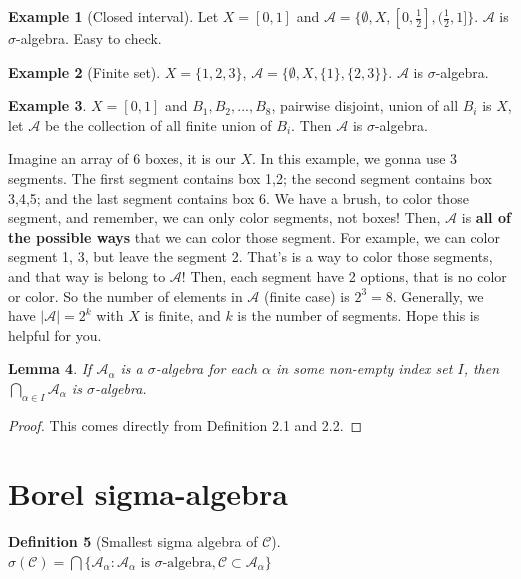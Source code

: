\documentclass[11pt,a4paper]{article}
\theoremstyle{definition}
\newtheorem{definition}{Definition}[section]
\newtheorem{example}[definition]{Example}
\theoremstyle{plain}
\newtheorem{lemma}[definition]{Lemma}
\newcommand{\A}{\mathcal{A}}
\begin{document}
\begin{example}[Closed interval]
Let $X=[0,1]$ and $\A=\{\emptyset, X, [0,\frac{1}{2}], (\frac{1}{2},1]\}$. $\A$ is $\sigma$-algebra. Easy to check.
\end{example}

\begin{example}[Finite set]
$X=\{1,2,3\}$, $\A = \{\emptyset, X, \{1\}, \{2,3\}\}$. $\A$ is $\sigma$-algebra.
\end{example}

\begin{example}
$X=[0,1]$ and $B_1,B_2,..., B_8$, pairwise disjoint, union of all $B_i$ is $X$, let $\A$ be the collection of all finite union of $B_i$. Then $\A$ is $\sigma$-algebra.
\end{example}

\begin{mynote}
Imagine an array of 6 boxes, it is our $X$. In this example, we gonna use 3 segments. The first segment contains box 1,2; the second segment contains box 3,4,5; and the last segment contains box 6. We have a brush, to color those segment, and remember, we can only color segments, not boxes! Then, $\A$ is \textbf{all of the possible ways} that we can color those segment. For example, we can color segment 1, 3, but leave the segment 2. That's is a way to color those segments, and that way is belong to $\A$! Then, each segment have 2 options, that is no color or color. So the number of elements in $\A$ (finite case) is $2^3=8$. Generally, we have $|\A|=2^k$ with $X$ is finite, and $k$ is the number of segments. Hope this is helpful for you.
\end{mynote}

\begin{lemma}
If $\A_{\alpha}$ is a $\sigma$-algebra for each $\alpha$ in some non-empty index set $I$, then $\bigcap_{\alpha\in I}\A_{\alpha}$ is $\sigma$-algebra.
\end{lemma}

\begin{proof}
This comes directly from Definition 2.1 and 2.2.
\end{proof}

\section{Borel sigma-algebra}

\begin{definition}[Smallest sigma algebra of $\mathcal{C}$]
$\sigma(\mathcal{C}) = \bigcap\{\A_{\alpha}: \A_{\alpha} \text{ is $\sigma$-algebra}, \mathcal{C}\subset \A_{\alpha}\}$
\end{definition}
\end{document}

